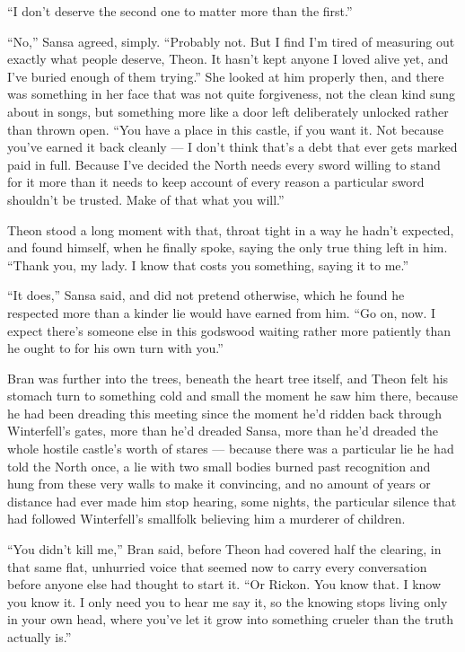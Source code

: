 “I don’t deserve the second one to matter more than the first.”

“No,” Sansa agreed, simply. “Probably not. But I find I’m tired of measuring out exactly what people deserve, Theon. It hasn’t kept anyone I loved alive yet, and I’ve buried enough of them trying.” She looked at him properly then, and there was something in her face that was not quite forgiveness, not the clean kind sung about in songs, but something more like a door left deliberately unlocked rather than thrown open. “You have a place in this castle, if you want it. Not because you’ve earned it back cleanly — I don’t think that’s a debt that ever gets marked paid in full. Because I’ve decided the North needs every sword willing to stand for it more than it needs to keep account of every reason a particular sword shouldn’t be trusted. Make of that what you will.”

Theon stood a long moment with that, throat tight in a way he hadn’t expected, and found himself, when he finally spoke, saying the only true thing left in him. “Thank you, my lady. I know that costs you something, saying it to me.”

“It does,” Sansa said, and did not pretend otherwise, which he found he respected more than a kinder lie would have earned from him. “Go on, now. I expect there’s someone else in this godswood waiting rather more patiently than he ought to for his own turn with you.”

\sceneBreak

Bran was further into the trees, beneath the heart tree itself, and Theon felt his stomach turn to something cold and small the moment he saw him there, because he had been dreading this meeting since the moment he’d ridden back through Winterfell’s gates, more than he’d dreaded Sansa, more than he’d dreaded the whole hostile castle’s worth of stares — because there was a particular lie he had told the North once, a lie with two small bodies burned past recognition and hung from these very walls to make it convincing, and no amount of years or distance had ever made him stop hearing, some nights, the particular silence that had followed Winterfell’s smallfolk believing him a murderer of children.

“You didn’t kill me,” Bran said, before Theon had covered half the clearing, in that same flat, unhurried voice that seemed now to carry every conversation before anyone else had thought to start it. “Or Rickon. You know that. I know you know it. I only need you to hear me say it, so the knowing stops living only in your own head, where you’ve let it grow into something crueler than the truth actually is.”

